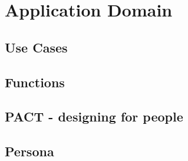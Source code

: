 \chapter{Application Domain}

\section{Use Cases}\label{usecase}


\section{Functions}


\section{PACT - designing for people}


\section{Persona}

